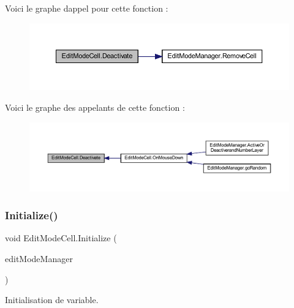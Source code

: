 Voici le graphe d\textquotesingle{}appel pour cette fonction \+:\nopagebreak
\begin{figure}[H]
\begin{center}
\leavevmode
\includegraphics[width=350pt]{class_edit_mode_cell_a972bc99f957f4a37dcd482162e9762c8_cgraph}
\end{center}
\end{figure}
Voici le graphe des appelants de cette fonction \+:\nopagebreak
\begin{figure}[H]
\begin{center}
\leavevmode
\includegraphics[width=350pt]{class_edit_mode_cell_a972bc99f957f4a37dcd482162e9762c8_icgraph}
\end{center}
\end{figure}
\mbox{\label{class_edit_mode_cell_a85064e1ba44195ce0a8fa8c66f8e5ffa}} 
\subsubsection{\texorpdfstring{Initialize()}{Initialize()}}
{\footnotesize\ttfamily void Edit\+Mode\+Cell.\+Initialize (\begin{DoxyParamCaption}\item[{\mbox{\hyperlink{class_edit_mode_manager}{Edit\+Mode\+Manager}}}]{edit\+Mode\+Manager }\end{DoxyParamCaption})\hspace{0.3cm}{\ttfamily [inline]}}



Initialisation de variable. 


